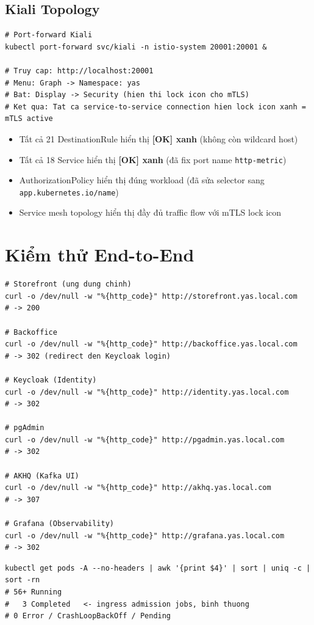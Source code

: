 \subsection{Kiali Topology}

\begin{lstlisting}[style=bashstyle, caption=Truy cập Kiali và kiểm tra topology]
# Port-forward Kiali
kubectl port-forward svc/kiali -n istio-system 20001:20001 &

# Truy cap: http://localhost:20001
# Menu: Graph -> Namespace: yas
# Bat: Display -> Security (hien thi lock icon cho mTLS)
# Ket qua: Tat ca service-to-service connection hien lock icon xanh = mTLS active
\end{lstlisting}

\begin{infobox}
\begin{itemize}
  \item Tất cả 21 DestinationRule hiển thị \textbf{[OK] xanh} (không còn wildcard host)
  \item Tất cả 18 Service hiển thị \textbf{[OK] xanh} (đã fix port name \texttt{http-metric})
  \item AuthorizationPolicy hiển thị đúng workload (đã sửa selector sang \texttt{app.kubernetes.io/name})
  \item Service mesh topology hiển thị đầy đủ traffic flow với mTLS lock icon
\end{itemize}
\end{infobox}

\section{Kiểm thử End-to-End}

\begin{lstlisting}[style=bashstyle, caption=Test tổng thể các URL hệ thống]
# Storefront (ung dung chinh)
curl -o /dev/null -w "%{http_code}" http://storefront.yas.local.com
# -> 200

# Backoffice
curl -o /dev/null -w "%{http_code}" http://backoffice.yas.local.com
# -> 302 (redirect den Keycloak login)

# Keycloak (Identity)
curl -o /dev/null -w "%{http_code}" http://identity.yas.local.com
# -> 302

# pgAdmin
curl -o /dev/null -w "%{http_code}" http://pgadmin.yas.local.com
# -> 302

# AKHQ (Kafka UI)
curl -o /dev/null -w "%{http_code}" http://akhq.yas.local.com
# -> 307

# Grafana (Observability)
curl -o /dev/null -w "%{http_code}" http://grafana.yas.local.com
# -> 302
\end{lstlisting}

\begin{lstlisting}[style=bashstyle, caption=Kiểm tra tổng thể pods]
kubectl get pods -A --no-headers | awk '{print $4}' | sort | uniq -c | sort -rn
# 56+ Running
#   3 Completed   <- ingress admission jobs, binh thuong
# 0 Error / CrashLoopBackOff / Pending
\end{lstlisting}
